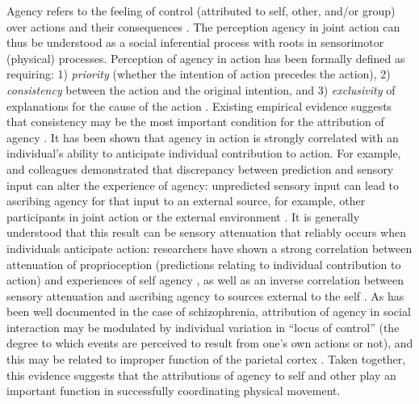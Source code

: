 \begin{CJK}{UTF8}{gbsn}
Agency refers to the feeling of control (attributed to self, other, and/or group) over actions and their consequences \citep{Moore2016}.  The perception agency in joint action can thus be understood as a social inferential process with roots in sensorimotor (physical) processes.  Perception of agency in action has been formally defined as requiring: 1) \textit{priority} (whether the intention of action precedes the action), 2) \textit{consistency} between the action and the original intention, and 3) \textit{exclusivity} of explanations for the cause of the action \citep{Wegner1999}.  Existing empirical evidence suggests that consistency may be the most important condition for the attribution of agency \citep{VanderWel2012}.  It has been shown that agency in action is strongly correlated with an individual's ability to anticipate individual contribution to action.  For example, \textcite{Sato2008} and colleagues demonstrated that discrepancy between prediction and sensory input can alter the experience of agency: unpredicted sensory input can lead to ascribing agency for that input to an external source, for example, other participants in joint action or the external environment \citep{Sato2005,Frith2007}.  It is generally understood that this result can be sensory attenuation that reliably occurs when individuals anticipate action:  researchers have shown a strong correlation between attenuation of proprioception (predictions relating to individual contribution to action) and experiences of self agency \citep{Wolpert2003,Sato2008}, as well as an inverse correlation between sensory attenuation and ascribing agency to sources external to the self \citep{Brown2013}.  As has been well documented in the case of schizophrenia, attribution of agency in social interaction may be modulated by individual variation in ``locus of control'' (the degree to which events are perceived to result from one’s own actions or not), and this may be related to improper function of the parietal cortex \citep{Frith2000}.  Taken together, this evidence suggests that the attributions of agency to self and other play an important function in successfully coordinating physical movement.


\end{CJK}
